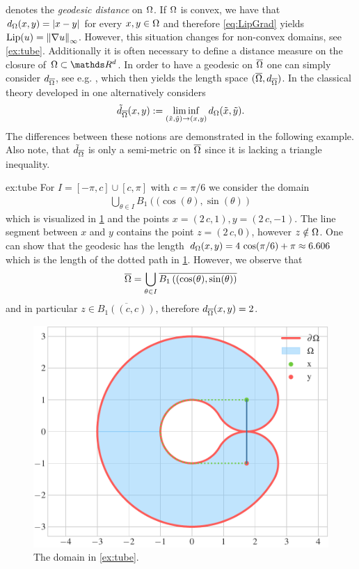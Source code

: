 %
denotes the \emph{geodesic distance} on $\Omega$. If $\Omega$ is convex, we have that $d_\Omega(x,y) = \left|x-y\right|$ for every 
$x,y\in \Omega$ and therefore \cref{eq:LipGrad} yields $\operatorname{Lip}(u) = \left\|\nabla u\right\|_\infty$. However, this situation changes for non-convex domains, see \cref{ex:tube}. Additionally it is often necessary to define 
a distance measure on the closure of $\domain\subset\R^d$. In order to have a geodesic on $\overline{\Omega}$ one can simply consider $d_{\overline{\Omega}}$, see e.g. \cite{bungert2021uniform}, which then yields the length space $(\overline{\Omega}, d_{\overline{\Omega}})$. In the classical theory developed in \cite{jensen1993uniqueness} one alternatively considers
%
\begin{align*}
\tilde{d}_{\overline{\Omega}}(x,y) := \liminf_{(\tilde x,\tilde y)\to(x,y)} d_\Omega(\tilde{x},\tilde{y}).
\end{align*}
%
The differences between these notions are demonstrated in the following example. Also note, that $\tilde{d}_{\overline{\Omega}}$ is only a semi-metric on $\overline{\Omega}$ since it is lacking a triangle inequality.
%
\begin{example}{}{ex:tube}
For $I = [-\pi, c]\cup [c, \pi]$ with $c=\pi/6$ we consider the domain
%
\begin{align*}
\bigcup_{\theta \in I} B_1\left((\cos(\theta),\sin(\theta)\right)
\end{align*}
%
which is visualized in \cref{fig:tube} and the points $x=(2\, c, 1), y= (2\, c, -1)$. The 
line segment between $x$ and $y$ contains the point $z=(2\, c, 0)$, however $z\notin \Omega$. One can show that 
the geodesic has the length $d_\Omega(x,y) = 4\, \cos(\pi/6) + \pi \approx 6.606$ which is the length of the dotted path 
in \cref{fig:tube}. However, we observe that 
%
\begin{align*}
\overline{\Omega} = \bigcup_{\theta \in I } 
\overline{B_1\left((\cos(\theta),\sin(\theta)\right)}
\end{align*}
%
and in particular $z\in \overline{B_1\left((c,c)\right)}$, therefore $d_{\overline{\Omega}}(x,y) = 2$.
\end{example}
%
\begin{figure}
\centering
\includegraphics[width=.5\textwidth]{code/domains/tube.pdf}
\caption{The domain in \cref{ex:tube}.}\label{fig:tube}
\end{figure}
%
%
